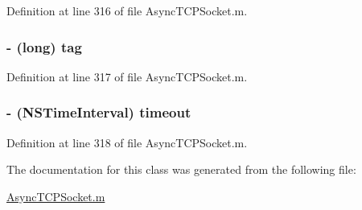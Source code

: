 Definition at line 316 of file AsyncTCPSocket.m.

\hypertarget{interface_async_write_packet_ae10c29173f0af40507d7e787905c7130}{
\subsubsection[{tag}]{\setlength{\rightskip}{0pt plus 5cm}-\/ (long) {\bf tag}}}
\label{interface_async_write_packet_ae10c29173f0af40507d7e787905c7130}


Definition at line 317 of file AsyncTCPSocket.m.

\hypertarget{interface_async_write_packet_a39233eb85b4cbae04411577510e7c5e6}{
\subsubsection[{timeout}]{\setlength{\rightskip}{0pt plus 5cm}-\/ (NSTimeInterval) {\bf timeout}}}
\label{interface_async_write_packet_a39233eb85b4cbae04411577510e7c5e6}


Definition at line 318 of file AsyncTCPSocket.m.



The documentation for this class was generated from the following file:\begin{DoxyCompactItemize}
\item 
\hyperlink{_async_t_c_p_socket_8m}{AsyncTCPSocket.m}\end{DoxyCompactItemize}
